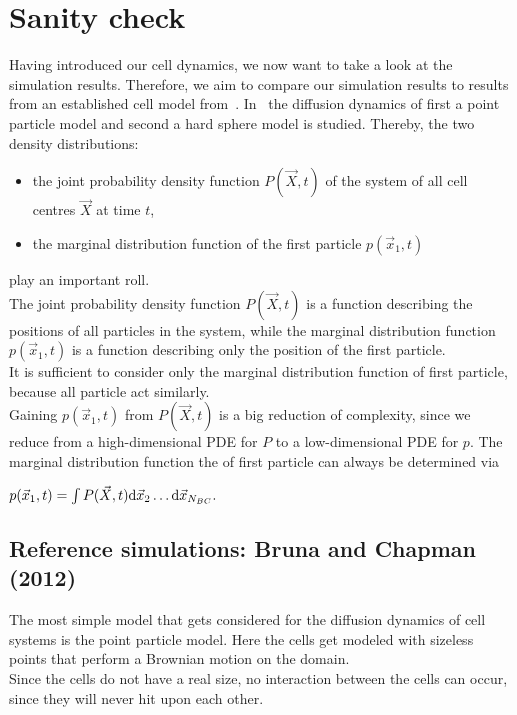 \section{Sanity check} \label{sanitycheck}
Having introduced our cell dynamics, we now want to take a look at the simulation results.
Therefore, we aim to compare our simulation results to results from an established cell model from~\cite{Bruna2012}. 
In~\cite{Bruna2012} the diffusion dynamics of first a point particle model and second a hard sphere model is studied. 
Thereby, the two density distributions:
\begin{itemize}
    \item the joint probability density function $P(\vec{X}, t)$ of the system of all cell centres $\vec{X}$ at time $t$,
    \item the marginal distribution function of the first particle $p(\vec{x}_1, t)$
\end{itemize}
play an important roll. \\
The joint probability density function $P(\vec{X}, t)$ is a function describing the positions of all particles in the system, while the marginal distribution function $p(\vec{x}_1, t)$ is a function describing only the position of the first particle. \\
It is sufficient to consider only the marginal distribution function of first particle, because all particle act similarly. \\ 
Gaining $p(\vec{x}_1, t)$ from $P(\vec{X}, t)$ is a big reduction of complexity, since we reduce from a high-dimensional PDE for $P$ to a low-dimensional PDE for $p$. 
The marginal distribution function the of first particle can always be determined via
\begin{center}
    $
    p(\vec{x}_1, t) = \int P(\vec{X}, t) \mathrm{d} \vec{x}_2 \dots  \mathrm{d} \vec{x}_{N_{BC}}.
    $
\end{center} 

\subsection{Reference simulations: Bruna and Chapman (2012)}
The most simple model that gets considered for the diffusion dynamics of cell systems is the point particle model. 
Here the cells get modeled with sizeless points that perform a Brownian motion on the domain. \\
Since the cells do not have a real size, no interaction between the cells can occur, since they will never hit upon each other.  


